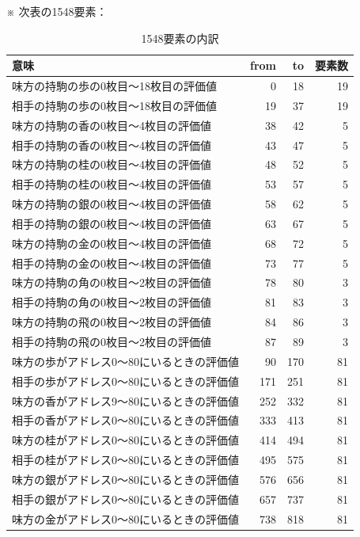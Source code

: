 \documentclass[a4paper]{ltjsarticle}
\begin{document}
※ 次表の1548要素：
\begin{table}[H]
  \centering
  \caption{1548要素の内訳}
  \small
  \begin{tabular}{lrrr}
    意味 & from & to & 要素数 \\ \hline
    味方の持駒の歩の0枚目～18枚目の評価値 &  0 & 18 & 19 \\
    相手の持駒の歩の0枚目～18枚目の評価値 & 19 & 37 & 19 \\
    味方の持駒の香の0枚目～4枚目の評価値  & 38 & 42 &  5 \\
    相手の持駒の香の0枚目～4枚目の評価値  & 43 & 47 &  5 \\
    味方の持駒の桂の0枚目～4枚目の評価値  & 48 & 52 &  5 \\
    相手の持駒の桂の0枚目～4枚目の評価値  & 53 & 57 &  5 \\
    味方の持駒の銀の0枚目～4枚目の評価値  & 58 & 62 &  5 \\
    相手の持駒の銀の0枚目～4枚目の評価値  & 63 & 67 &  5 \\
    味方の持駒の金の0枚目～4枚目の評価値  & 68 & 72 &  5 \\
    相手の持駒の金の0枚目～4枚目の評価値  & 73 & 77 &  5 \\
    味方の持駒の角の0枚目～2枚目の評価値  & 78 & 80 &  3 \\
    相手の持駒の角の0枚目～2枚目の評価値  & 81 & 83 &  3 \\
    味方の持駒の飛の0枚目～2枚目の評価値  & 84 & 86 &  3 \\
    相手の持駒の飛の0枚目～2枚目の評価値  & 87 & 89 &  3 \\
    味方の歩がアドレス0～80にいるときの評価値 &   90 &  170 & 81 \\
    相手の歩がアドレス0～80にいるときの評価値 &  171 &  251 & 81 \\
    味方の香がアドレス9～80にいるときの評価値 &  252 &  332 & 81 \\
    相手の香がアドレス0～80にいるときの評価値 &  333 &  413 & 81 \\
    味方の桂がアドレス0～80にいるときの評価値 &  414 &  494 & 81 \\
    相手の桂がアドレス0～80にいるときの評価値 &  495 &  575 & 81 \\
    味方の銀がアドレス0～80にいるときの評価値 &  576 &  656 & 81 \\
    相手の銀がアドレス0～80にいるときの評価値 &  657 &  737 & 81 \\
    味方の金がアドレス0～80にいるときの評価値 &  738 &  818 & 81 \\

\end{tabular}
\end{table}
\end{document}
